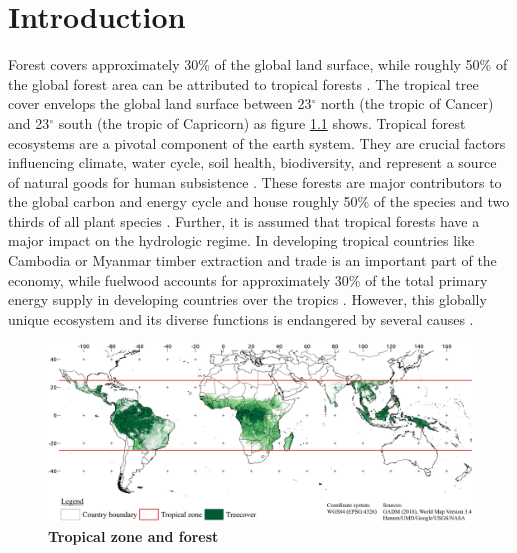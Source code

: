 \chapter{Introduction}
\label{ch:introduction}
	Forest covers approximately 30\% of the global land surface, while roughly 50\% of the global forest area can be attributed to tropical forests \citep{WWF2016}. The tropical tree cover envelops the global land surface between 23$^\circ$ north (the tropic of Cancer) and 23$^\circ$ south (the tropic of Capricorn) as figure \ref{fig:tropicalzone} shows. Tropical forest ecosystems are a pivotal component of the earth system. They are crucial factors influencing climate, water cycle, soil health, biodiversity, and represent a source of natural goods for human subsistence \citep{Wright2005}. These forests are major contributors to the global carbon and energy cycle and house roughly 50\% of the species and two thirds of all plant species \citep{Wright2005,Jordan2005}. Further, it is assumed that tropical forests have a major impact on the hydrologic regime. In developing tropical countries like Cambodia or Myanmar timber extraction and trade is an important part of the economy, while fuelwood accounts for approximately 30\% of the total primary energy supply in developing countries over the tropics \citep{Jordan2005}. However, this globally unique ecosystem and its diverse functions is endangered by several causes \citep{WWF2016}.
	\begin{figure}[ht]
		\centering
		\includegraphics[scale=.97]{img/intro_overview_frameless}
		\caption[Tropical zone and forest]{\textbf{Tropical zone and forest}}
		\label{fig:tropicalzone}
	\end{figure}

